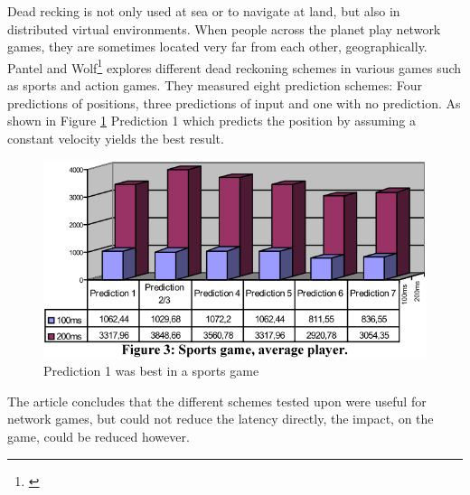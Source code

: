 Dead recking is not only used at sea or to navigate at land, but also in distributed virtual environments. When people across the planet play network games, they are sometimes located very far from each other, geographically. Pantel and Wolf\footnote{\cite{Pantel2002}} explores different dead reckoning schemes in various games such as sports and action games. They measured eight prediction schemes: Four predictions of positions, three predictions of input and one with no prediction. As shown in Figure \ref{fig:wolfpeperimage} Prediction 1 which predicts the position by assuming a constant velocity yields the best result.

\begin{figure}[H]
	\centering
	\includegraphics[width=0.5\linewidth]{positioning/positioning/wolfpeperImage}
	\caption{Prediction 1 was best in a sports game}
	\label{fig:wolfpeperimage}
\end{figure}

The article concludes that the different schemes tested upon were useful for network games, but could not reduce the latency directly, the impact, on the game, could be reduced however.